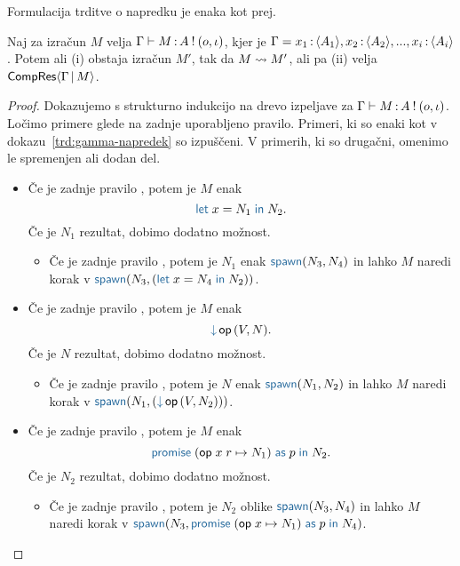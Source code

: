 Formulacija trditve o napredku je enaka kot prej.

\begin{trditev}[o napredku]\label{trd:gamma-napredek-2}
	Naj za izračun $M$ velja $\Gamma \vdash M \mathinner{:} A \mathbin{!} (o, \iota)$, kjer je $\Gamma = x_1 \mathinner{:} \langle A_1 \rangle, x_2 \mathinner{:} \langle A_2 \rangle,..., x_i \mathinner{:} \langle A_i \rangle$. Potem ali (i) obstaja izračun $M'$, tak da $M \leadsto M'$, ali pa (ii) velja $\mathsf{CompRes}\langle\Gamma \,\vert\, M\rangle$.
\end{trditev}

\begin{proof}
	Dokazujemo s strukturno indukcijo na drevo izpeljave za $\Gamma \vdash M \mathinner{:} A \mathbin{!} (o, \iota)$.
	Ločimo primere glede na zadnje uporabljeno pravilo.
	Primeri, ki so enaki kot v dokazu~\ref{trd:gamma-napredek} so izpuščeni. V primerih, ki so drugačni, omenimo le spremenjen ali dodan del.
	
	\begin{itemize}
		\item Če je zadnje pravilo , potem je $M$ enak $$\tmlet{x}{N_1}{N_2}.$$
		Če je $N_1$ rezultat, dobimo dodatno možnost.
		\begin{itemize}
			\item Če je zadnje pravilo , potem je $N_1$ enak $\tmspawn{N_3}{N_4}$ in lahko $M$ naredi korak v $\tmspawn{N_3}{(\tmlet{x}{N_4}{N_2})}$.
		\end{itemize}
		
		\item Če je zadnje pravilo , potem je $M$ enak $$\tmopin{op}{V}{N}.$$
		Če je $N$ rezultat, dobimo dodatno možnost.
		\begin{itemize}
			\item Če je zadnje pravilo , potem je $N$ enak $\tmspawn{N_1}{N_2}$ in lahko $M$ naredi korak v $\tmspawn{N_1}{(\tmopin{op}{V}{N_2})}$.
		\end{itemize}
		
		
		\item Če je zadnje pravilo , potem je $M$ enak $$\tmwithrec{op}{x}{r}{N_1}{p}{N_2}.$$
		Če je $N_2$ rezultat, dobimo dodatno možnost.
		\begin{itemize}
			\item Če je zadnje pravilo , potem je $N_2$ oblike $\tmspawn{N_3}{N_4}$ in lahko $M$ naredi korak v $\tmspawn{N_3}{\tmwith{op}{x}{N_1}{p}{N_4}}$.
		\end{itemize}		
	\end{itemize}	
\end{proof}


